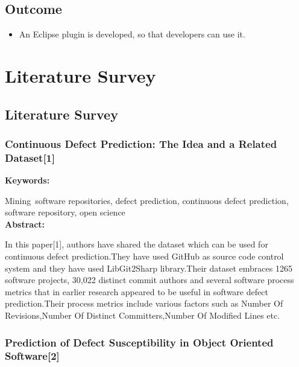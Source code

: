 \documentclass[oneside,a4paper,12pt]{book}
\begin{document}
\section{Outcome}
\setlength{\parskip}{0.0pt}
\begin{itemize}
    \item An Eclipse plugin is developed, so that developers can use it.\par
\end{itemize}
	

\chapter{Literature Survey}


\section{Literature Survey}


\subsection{Continuous Defect Prediction: The Idea and a Related Dataset[1]}

\setlength{\parskip}{0.0pt}
\textbf{Keywords:}\par

\textbf{ }Mining\ software repositories, defect prediction, continuous defect prediction,  software repository, open science\\
\setlength{\parskip}{0.0pt}
\textbf{Abstract:}\par

\begin{justify}
\textbf{ }
In this paper[1], authors have shared the dataset which can be used for continuous defect prediction.They have used GitHub as source code control system and they have used LibGit2Sharp library.Their dataset embraces 1265 software projects, 30,022 distinct commit authors and several software process metrics that in earlier research appeared to be useful in software defect prediction.Their process metrics include various factors such as Number Of Revisions,Number Of Distinct Committers,Number Of Modified Lines etc. 
\end{justify}\par



\subsection{Prediction of Defect Susceptibility in Object Oriented Software[2]}
\end{document}
